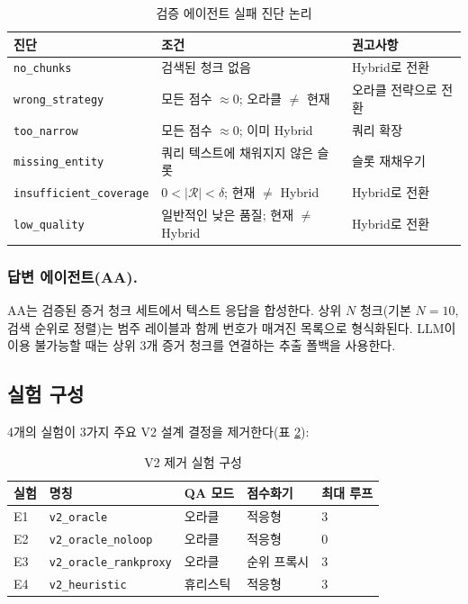 \documentclass[11pt, a4paper]{article}
\begin{document}
\begin{table}[htbp]
\centering
\caption{검증 에이전트 실패 진단 논리}
\label{tab:failure_diag}
\begin{tabular}{lll}
\toprule
\textbf{진단} & \textbf{조건} & \textbf{권고사항} \\
\midrule
\texttt{no\_chunks}             & 검색된 청크 없음               & Hybrid로 전환 \\
\texttt{wrong\_strategy}        & 모든 점수 $\approx 0$; 오라클 $\neq$ 현재 & 오라클 전략으로 전환 \\
\texttt{too\_narrow}            & 모든 점수 $\approx 0$; 이미 Hybrid & 쿼리 확장 \\
\texttt{missing\_entity}        & 쿼리 텍스트에 채워지지 않은 슬롯 & 슬롯 재채우기 \\
\texttt{insufficient\_coverage} & $0 < |\mathcal{R}| < \delta$; 현재 $\neq$ Hybrid & Hybrid로 전환 \\
\texttt{low\_quality}           & 일반적인 낮은 품질; 현재 $\neq$ Hybrid & Hybrid로 전환 \\
\bottomrule
\end{tabular}
\end{table}

\subsubsection*{답변 에이전트(AA).}

AA는 검증된 증거 청크 세트에서 텍스트 응답을 합성한다. 상위 $N$ 청크(기본 $N{=}10$, 검색 순위로 정렬)는 범주 레이블과 함께 번호가 매겨진 목록으로 형식화된다. LLM이 이용 불가능할 때는 상위 3개 증거 청크를 연결하는 추출 폴백을 사용한다.

\subsection{실험 구성}

4개의 실험이 3가지 주요 V2 설계 결정을 제거한다(표 \ref{tab:experiments}):

\begin{table}[htbp]
\centering
\caption{V2 제거 실험 구성}
\label{tab:experiments}
\begin{tabular}{lllll}
\toprule
\textbf{실험} & \textbf{명칭} & \textbf{QA 모드} & \textbf{점수화기} & \textbf{최대 루프} \\
\midrule
E1 & \texttt{v2\_oracle}            & 오라클    & 적응형    & 3 \\
E2 & \texttt{v2\_oracle\_noloop}    & 오라클    & 적응형    & 0 \\
E3 & \texttt{v2\_oracle\_rankproxy} & 오라클    & 순위 프록시 & 3 \\
E4 & \texttt{v2\_heuristic}         & 휴리스틱  & 적응형    & 3 \\
\bottomrule
\end{tabular}
\end{table}
\end{document}
